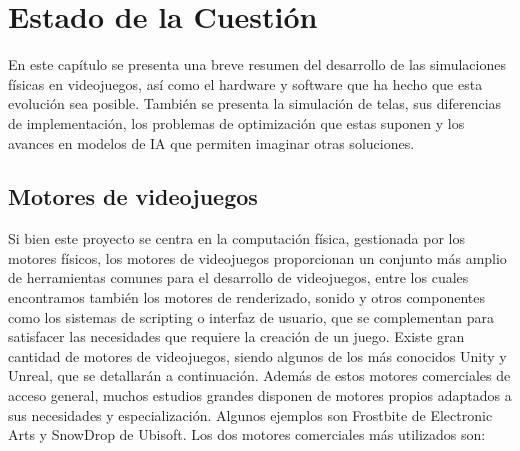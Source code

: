 \chapter{Estado de la Cuestión}
\label{cap:estadoDeLaCuestion}
En este capítulo se presenta una breve resumen del desarrollo de las simulaciones físicas en videojuegos, así como el hardware y software que ha hecho que esta evolución sea posible. También se presenta la simulación de telas, sus diferencias de implementación, los problemas de optimización que estas suponen y los avances en modelos de IA que permiten imaginar otras soluciones.

\section{Motores de videojuegos}
Si bien este proyecto se centra en la computación física, gestionada por los motores físicos, los motores de videojuegos proporcionan un conjunto más amplio de herramientas comunes para el desarrollo de videojuegos, entre los cuales encontramos también los motores de renderizado, sonido y otros componentes como los sistemas de scripting o interfaz de usuario, que se complementan para satisfacer las necesidades que requiere la creación de un juego. Existe gran cantidad de motores de videojuegos, siendo algunos de los más conocidos Unity y Unreal, que se detallarán a continuación. Además de estos motores comerciales de acceso general, muchos estudios grandes disponen de motores propios adaptados a sus necesidades y especialización. Algunos ejemplos son Frostbite de Electronic Arts y SnowDrop de Ubisoft. Los dos motores comerciales más utilizados son: \newline

